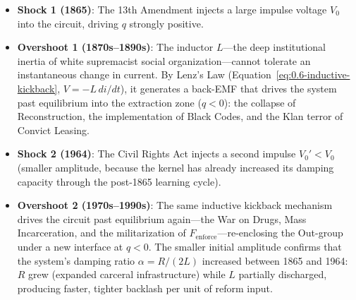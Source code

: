 \begin{itemize}
    \item \textbf{Shock 1 (1865)}: The 13th Amendment injects a large impulse voltage $V_0$ into the circuit, driving $q$ strongly positive.
    \item \textbf{Overshoot 1 (1870s--1890s)}: The inductor $L$---the deep institutional inertia of white supremacist social organization---cannot tolerate an instantaneous change in current. By Lenz's Law (Equation~\ref{eq:0.6-inductive-kickback}, $V = -L\,di/dt$), it generates a back-EMF that drives the system past equilibrium into the extraction zone ($q < 0$): the collapse of Reconstruction, the implementation of Black Codes, and the Klan terror of Convict Leasing.
    
    \item \textbf{Shock 2 (1964)}: The Civil Rights Act injects a second impulse $V_0' < V_0$ (smaller amplitude, because the kernel has already increased its damping capacity through the post-1865 learning cycle).
    \item \textbf{Overshoot 2 (1970s--1990s)}: The same inductive kickback mechanism drives the circuit past equilibrium again---the War on Drugs, Mass Incarceration, and the militarization of $F_{\text{enforce}}$---re-enclosing the Out-group under a new interface at $q < 0$. The smaller initial amplitude confirms that the system's damping ratio $\alpha = R/(2L)$ increased between 1865 and 1964: $R$ grew (expanded carceral infrastructure) while $L$ partially discharged, producing faster, tighter backlash per unit of reform input.
\end{itemize}

